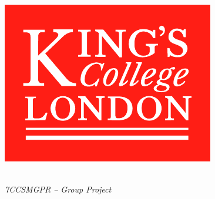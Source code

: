 \documentclass[11pt]{article}
\begin{document}

\begin{titlepage}
	
	\centering
	
	\hspace{0pt}
	\vspace*{\fill}
	
	\includegraphics*[scale = 1.0]{graphics/kcl-logo-colour.pdf}
	
	\hspace{0pt}
	\vspace*{\fill}
	
	 \\[8mm]
	\large\emph{7CCSMGPR -- Group Project} \\[5mm]
	

\end{titlepage}
\end{document}
